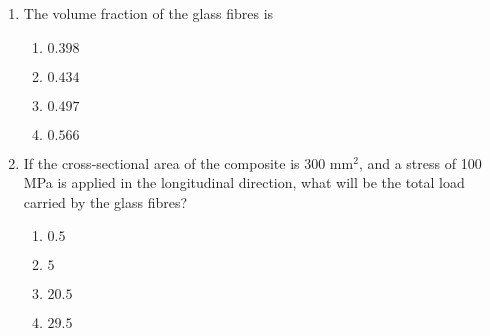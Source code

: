 \documentclass[journal]{IEEEtran}
\begin{document}
\begin{enumerate}
\textbf{Linked Answer Questions}\\
\textbf{Statement for Linked Answers Questions 21 and 22:}\\
A continuous and aligned glass fibre reinforced composite has a modulus of elasticity of 150 GPa in the longitudinal direction. The matrix is a polyester resin with a modulus of 4.5 GPa. The glass fibre has a modulus of 340 GPa.\\
\item The volume fraction of the glass fibres is
\begin{multicols}{4}
\begin{enumerate}
    \item $0.398$
    \item $0.434$
    \item $0.497$
    \item $0.566$
\end{enumerate}
\end{multicols}
\item If the cross-sectional area of the composite is 300
 mm$^{2}$, and a stress of 100 MPa is applied in the longitudinal direction, what will be the total load  carried by the glass fibres?  
\begin{multicols}{2}
\begin{enumerate}
    \item $0.5$
    \item $5$
    \item $20.5$
    \item $29.5$
\end{enumerate}
\end{multicols}
\end{enumerate}
\end{document}
